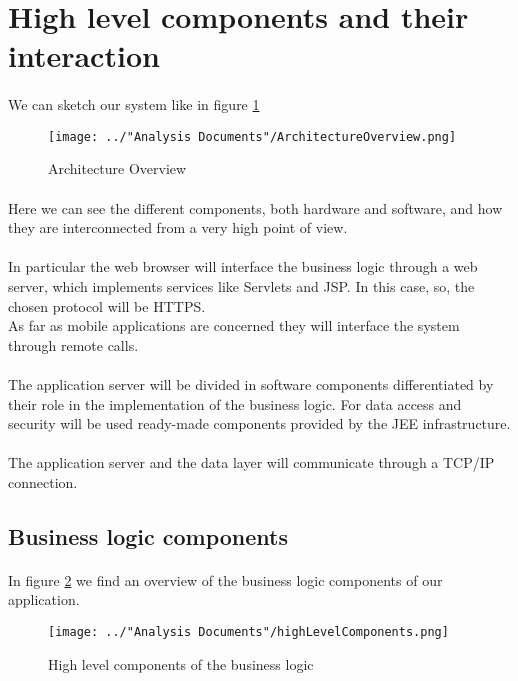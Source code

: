 \section{High level components and their interaction}
\paragraph{}We can sketch our system like in figure \ref{fig:architectureOverview}
\begin{figure}
	\centering
	\texttt{[image: ../"Analysis Documents"/ArchitectureOverview.png]}
	\caption{Architecture Overview}
	\label{fig:architectureOverview}
\end{figure}
\paragraph{}Here we can see the different components, both hardware and software, and how they are interconnected from a very high point of view.
\paragraph{} In particular the web browser will interface the business logic through a web server, which implements services like Servlets and JSP. In this case, so, the chosen protocol will be HTTPS.\\
As far as mobile applications are concerned they will interface the system through remote calls.
\paragraph{}The application server will be divided in software components differentiated by their role in the implementation of the business logic. For data access and security will be used ready-made components provided by the JEE infrastructure.
\paragraph{} The application server and the data layer will communicate through a TCP/IP connection.
\subsection{Business logic components}
\paragraph{} In figure \ref{fig:highLevelComponents} we find an overview of the business logic components of our application.
\begin{figure}
	\centering
	\texttt{[image: ../"Analysis Documents"/highLevelComponents.png]}
	\caption{High level components of the business logic}
	\label{fig:highLevelComponents}
\end{figure}

